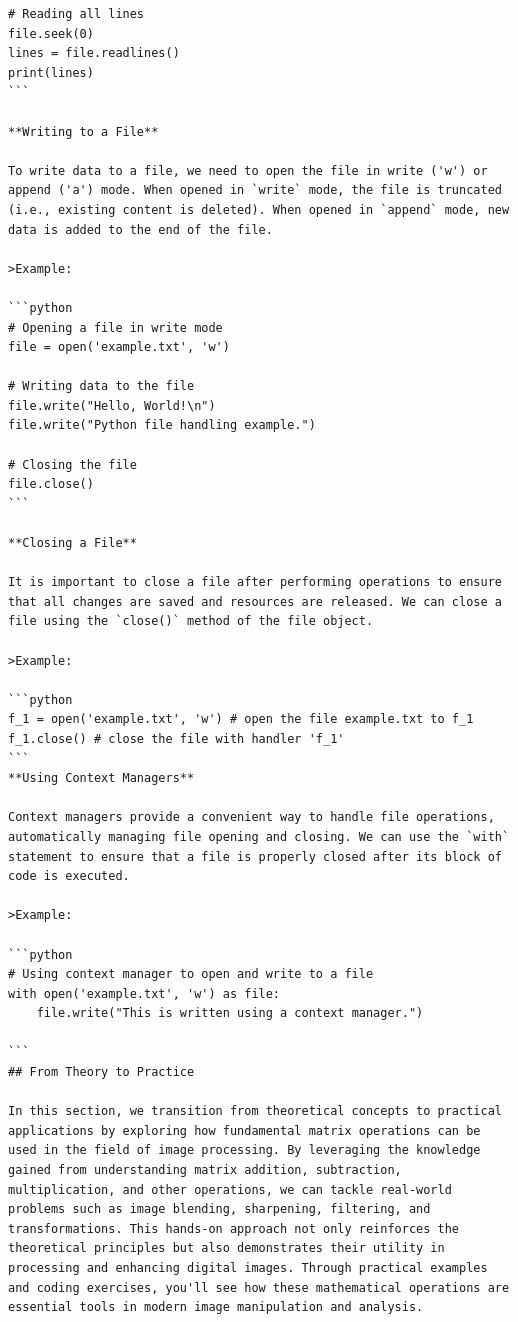 \documentclass[
  letterpaper,
  DIV=11,
  numbers=noendperiod]{scrreprt}
\theoremstyle{plain}
\theoremstyle{definition}
\theoremstyle{remark}
\begin{document}
\begin{verbatim}
# Reading all lines
file.seek(0)
lines = file.readlines()
print(lines)
```

**Writing to a File**

To write data to a file, we need to open the file in write ('w') or append ('a') mode. When opened in `write` mode, the file is truncated (i.e., existing content is deleted). When opened in `append` mode, new data is added to the end of the file.

>Example:

```python
# Opening a file in write mode
file = open('example.txt', 'w')

# Writing data to the file
file.write("Hello, World!\n")
file.write("Python file handling example.")

# Closing the file
file.close()
```

**Closing a File**

It is important to close a file after performing operations to ensure that all changes are saved and resources are released. We can close a file using the `close()` method of the file object.

>Example:

```python
f_1 = open('example.txt', 'w') # open the file example.txt to f_1
f_1.close() # close the file with handler 'f_1'
```
**Using Context Managers**

Context managers provide a convenient way to handle file operations, automatically managing file opening and closing. We can use the `with` statement to ensure that a file is properly closed after its block of code is executed.

>Example:

```python
# Using context manager to open and write to a file
with open('example.txt', 'w') as file:
    file.write("This is written using a context manager.")

```
## From Theory to Practice

In this section, we transition from theoretical concepts to practical applications by exploring how fundamental matrix operations can be used in the field of image processing. By leveraging the knowledge gained from understanding matrix addition, subtraction, multiplication, and other operations, we can tackle real-world problems such as image blending, sharpening, filtering, and transformations. This hands-on approach not only reinforces the theoretical principles but also demonstrates their utility in processing and enhancing digital images. Through practical examples and coding exercises, you'll see how these mathematical operations are essential tools in modern image manipulation and analysis.


\end{verbatim}
\end{document}

